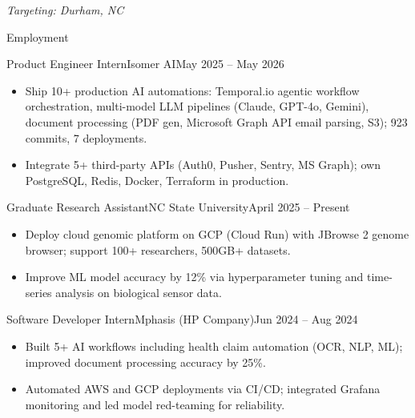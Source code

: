 \documentclass[]{mcdowellcv}
\begin{document}
\makeheader
\begin{center}\vspace{-12pt}\small\textit{Targeting: Durham, NC}\end{center}\vspace{-10pt}

\begin{cvsection}{Employment}
  \begin{cvsubsection}{Product Engineer Intern}{Isomer AI}{May 2025 -- May 2026}
    \begin{itemize}
      \item Ship 10+ production AI automations: Temporal.io agentic workflow orchestration, multi-model LLM pipelines (Claude, GPT-4o, Gemini), document processing (PDF gen, Microsoft Graph API email parsing, S3); 923 commits, 7 deployments.
      \item Integrate 5+ third-party APIs (Auth0, Pusher, Sentry, MS Graph); own PostgreSQL, Redis, Docker, Terraform in production.
    \end{itemize}
    \vspace{-1.5pt}
  \end{cvsubsection}

  \begin{cvsubsection}{Graduate Research Assistant}{NC State University}{April 2025 -- Present}
    \begin{itemize}
      \item Deploy cloud genomic platform on GCP (Cloud Run) with JBrowse 2 genome browser; support 100+ researchers, 500GB+ datasets.
      \item Improve ML model accuracy by 12\% via hyperparameter tuning and time-series analysis on biological sensor data.
    \end{itemize}
    \vspace{-1.5pt}
  \end{cvsubsection}

  \begin{cvsubsection}{Software Developer Intern}{Mphasis (HP Company)}{Jun 2024 -- Aug 2024}
    \begin{itemize}
      \item Built 5+ AI workflows including health claim automation (OCR, NLP, ML); improved document processing accuracy by 25\%.
      \item Automated AWS and GCP deployments via CI/CD; integrated Grafana monitoring and led model red-teaming for reliability.
    \end{itemize}
    \vspace{-1.5pt}
  \end{cvsubsection}


\end{cvsection}
\end{document}
